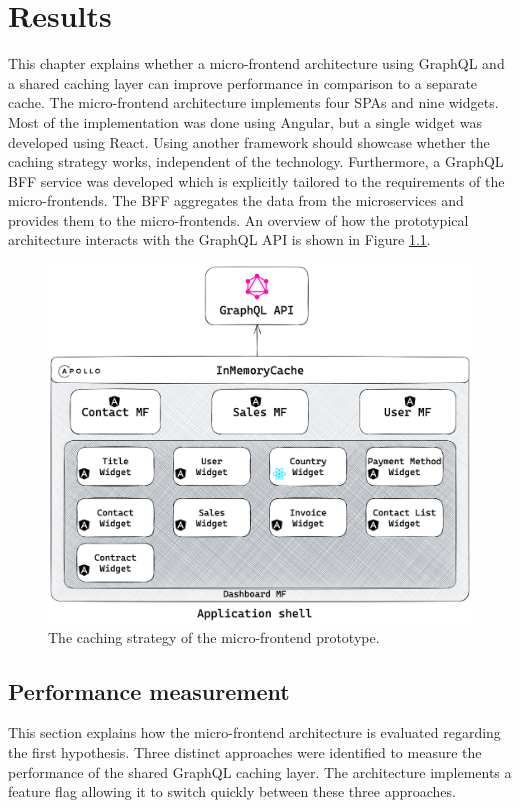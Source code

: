 \chapter{Results}\label{chapter:results}

This chapter explains whether a micro-frontend architecture using GraphQL and a shared caching layer can improve performance in comparison to a separate cache. The micro-frontend architecture implements four \acp{SPA} and nine widgets. Most of the implementation was done using Angular, but a single widget was developed using React. Using another framework should showcase whether the caching strategy works, independent of the technology. Furthermore, a GraphQL \ac{BFF} service was developed which is explicitly tailored to the requirements of the micro-frontends. The \ac{BFF} aggregates the data from the microservices and provides them to the micro-frontends. An overview of how the prototypical architecture interacts with the GraphQL \ac{API} is shown in Figure \ref{fig:results:micro-frontend-prototype}.

\ifshowImages
\begin{figure}[H]
  \centering
  \includegraphics[width=0.7\linewidth]{images/results/micro-frontend-prototype.png}
  \caption{The caching strategy of the micro-frontend prototype.}\label{fig:results:micro-frontend-prototype}
\end{figure}
\fi

\section{Performance measurement}\label{section:results:performance-measurement}

This section explains how the micro-frontend architecture is evaluated regarding the first hypothesis. Three distinct approaches were identified to measure the performance of the shared GraphQL caching layer. The architecture implements a feature flag allowing it to switch quickly between these three approaches.

